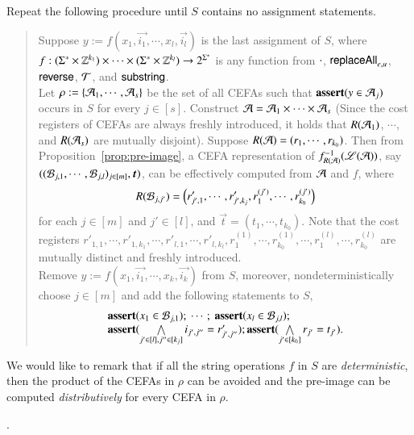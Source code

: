 Repeat the following procedure until $S$ contains no assignment statements.
%
\begin{quote}
Suppose $y := f(x_1, \vec{i_1}, \cdots, x_l, \vec{i_l})$ is the last assignment of $S$, where $f: (\Sigma^* \times \mathbb{Z}^{k_1}) \times \cdots \times (\Sigma^* \times \mathbb{Z}^{k_l}) \rightarrow 2^{\Sigma^*}$ is any function from $\cdot$, $\mathsf{replaceAll}_{e,u}$, $\mathsf{reverse}$, $\mathcal{T}$, and $\mathsf{substring}$.
\\
Let $\rho := \{\mathcal{A}_1, \cdots, \mathcal{A}_s\}$ be the set of all CEFAs such that $\textbf{assert}(y \in \mathcal{A}_j)$ occurs in $S$ for every $j \in [s]$. Construct $\mathcal{A} = \mathcal{A}_1 \times \cdots \times \mathcal{A}_s$ (Since the cost registers of CEFAs are always freshly introduced, it holds that $R(\mathcal{A}_1)$, $\cdots$, and $R(\mathcal{A}_s)$ are mutually disjoint). 
%
Suppose $R(\mathcal{A}) = (r_1, \cdots, r_{k_0})$. Then from Proposition~\ref{prop:pre-image}, 
a CEFA representation of $f^{-1}_{R(\mathcal{A})}(\mathscr{L}(\mathcal{A}))$, say $((\cB_{j, 1}, \cdots, \cB_{j, l})_{j \in [m]}, \vec{t})$, can be effectively computed from $\mathcal{A}$ and $f$, where 
\[
R(\mathcal{B}_{j,j'})=\left(r'_{j',1}, \cdots, r'_{j',k_j}, r^{(j')}_1, \cdots,r^{(j')}_{k_0} \right)
\]
for each $j \in [m]$ and $j' \in [l]$, and $\vec{t}=(t_1,\cdots, t_{k_0})$. Note that the cost registers $r'_{1,1}, \cdots, r'_{1,k_1},\cdots, r'_{l,1}, \cdots, r'_{l,k_l}, r^{(1)}_1, \cdots,r^{(1)}_{k_0}, \cdots, r^{(l)}_1, \cdots,r^{(l)}_{k_0}$ are mutually distinct and freshly introduced.\\
%
Remove $y := f(x_1, \vec{i_1}, \cdots, x_k, \vec{i_k})$ from $S$, moreover, nondeterministically choose $j \in [m]$ and add the following statements to $S$, 
%
\[
\begin{array}{l}
\textbf{assert}(x_1 \in \mathcal{B}_{j, 1});\ \cdots;\ \textbf{assert}(x_l \in \mathcal{B}_{j, l}); \\
\textbf{assert}(\bigwedge \limits_{j' \in [l], j'' \in [k_j]} i_{j', j''} = r'_{j', j''}); \textbf{assert}(\bigwedge \limits_{j' \in [k_0]} r_{j'} = t_{j'}).
\end{array}
\]
%
\end{quote}

We would like to remark that if all the string operations $f$ in $S$ are \emph{deterministic}, then the product of  the CEFAs in $\rho$ can be avoided and the pre-image can be computed \emph{distributively} for every CEFA in $\rho$. 

\medskip
{}.

